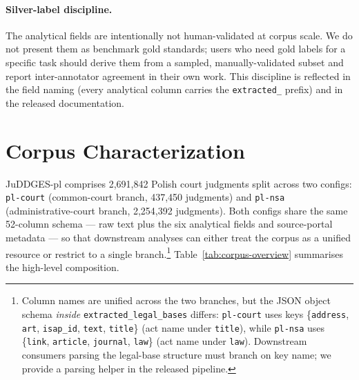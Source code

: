 \documentclass{article}
\begin{document}
\paragraph{Silver-label discipline.} The analytical fields are intentionally not human-validated at corpus scale. We do not present them as benchmark gold standards; users who need gold labels for a specific task should derive them from a sampled, manually-validated subset and report inter-annotator agreement in their own work. This discipline is reflected in the field naming (every analytical column carries the \texttt{extracted\_} prefix) and in the released documentation.

\section{Corpus Characterization}
\label{sec:characterization}

JuDDGES-pl comprises 2{,}691{,}842 Polish court judgments split across two configs: \texttt{pl-court} (common-court branch, 437{,}450 judgments) and \texttt{pl-nsa} (administrative-court branch, 2{,}254{,}392 judgments). Both configs share the same 52-column schema --- raw text plus the six analytical fields and source-portal metadata --- so that downstream analyses can either treat the corpus as a unified resource or restrict to a single branch.\footnote{Column names are unified across the two branches, but the JSON object schema \emph{inside} \texttt{extracted\_legal\_bases} differs: \texttt{pl-court} uses keys \{\texttt{address}, \texttt{art}, \texttt{isap\_id}, \texttt{text}, \texttt{title}\} (act name under \texttt{title}), while \texttt{pl-nsa} uses \{\texttt{link}, \texttt{article}, \texttt{journal}, \texttt{law}\} (act name under \texttt{law}). Downstream consumers parsing the legal-base structure must branch on key name; we provide a parsing helper in the released pipeline.} Table~\ref{tab:corpus-overview} summarises the high-level composition.
\end{document}
